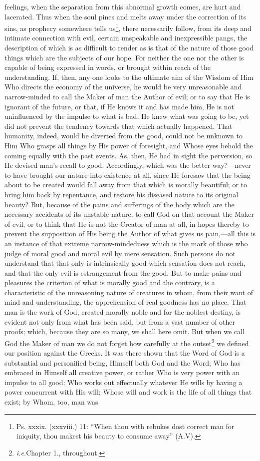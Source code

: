 feelings, when the separation from this abnormal growth comes, are hurt and lacerated. Thus when the soul pines and melts away under the correction of its sins, as prophecy somewhere tells us\footnote{Ps. xxxix. (xxxviii.) 11: “When thou with rebukes dost correct man for iniquity, thou makest his beauty to consume away” (A.V).}, there necessarily follow, from its deep and intimate connection with evil, certain unspeakable and inexpressible pangs, the description of which is as difficult to render as is that of the nature of those good things which are the subjects of our hope. For neither the one nor the other is capable of being expressed in words, or brought within reach of the understanding. If, then, any one looks to the ultimate aim of the Wisdom of Him Who directs the economy of the universe, he would be very unreasonable and narrow-minded to call the Maker of man the Author of evil; or to say that He is ignorant of the future, or that, if He knows it and has made him, He is not uninfluenced by the impulse to what is bad. He knew what was going to be, yet did not prevent the tendency towards that which actually happened. That humanity, indeed, would be diverted from the good, could not be unknown to Him Who grasps all things by His power of foresight, and Whose eyes behold the coming equally with the past events. As, then, He had in sight the perversion, so He devised man’s recall to good. Accordingly, which was the better way?—never to have brought our nature into existence at all, since He foresaw that the being about to be created would fall away from that which is morally beautiful; or to bring him back by repentance, and restore his diseased nature to its original beauty? But, because of the pains and sufferings of the body which are the necessary accidents of its unstable nature, to call God on that account the Maker of evil, or to think that He is not the Creator of man at all, in hopes thereby to prevent the supposition of His being the Author of what gives us pain,—all this is an instance of that extreme narrow-mindedness which is the mark of those who judge of moral good and moral evil by mere sensation. Such persons do not understand that that only is intrinsically good which sensation does not reach, and that the only evil is estrangement from the good. But to make pains and pleasures the criterion of what is morally good and the contrary, is a characteristic of the unreasoning nature of creatures in whom, from their want of mind and understanding, the apprehension of real goodness has no place. That man is the work of God, created morally noble and for the noblest destiny, is evident not only from what has been said, but from a vast number of other proofs; which, because they are so many, we shall here omit. But when we call God the Maker of man we do not forget how carefully at the outset\footnote{\emph{i.e.}Chapter 1., throughout.} we defined our position against the Greeks. It was there shown that the Word of God is a substantial and personified being, Himself both God and the Word; Who has embraced in Himself all creative power, or rather Who is very power with an impulse to all good; Who works out effectually whatever He wills by having a power concurrent with His will; Whose will and work is the life of all things that exist; by Whom, too, man was 
